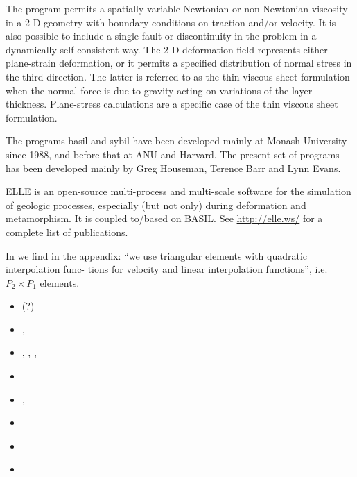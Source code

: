 The program permits a spatially variable Newtonian  or  non-Newtonian  viscosity  in a 2-D 
geometry with boundary conditions on traction and/or velocity.  It is also  possible  
to include  a single fault or discontinuity in the problem in a dynamically self consistent way.  
The 2-D deformation  field represents  either plane-strain deformation, or it permits 
a specified distribution of normal stress in the third  direction.   The  latter is referred 
to as the thin viscous sheet formulation when the normal force is due to  gravity  acting on 
variations of the layer thickness.  Plane-stress calculations are a specific case of 
the thin viscous sheet formulation.

The programs basil and sybil have been developed  mainly  at Monash  University  since  1988,  
and before that at ANU and Harvard.  The present set of  programs  has  been  developed mainly  by  
Greg  Houseman, Terence  Barr  and  Lynn Evans.

ELLE is an open-source multi-process and multi-scale software for the simulation of geologic processes, 
especially (but not only) during deformation and metamorphism. It is coupled to/based on BASIL. 
See \url{http://elle.ws/} for a complete list of publications.

In \textcite{baho96} we find in the appendix: ``we use triangular elements with quadratic interpolation func-
tions for velocity and linear interpolation functions'', i.e. $P_2 \times P_1$ elements.

\begin{small}
\begin{itemize}
\item[\nineteenninetytwo]    \textcite{baho92}(?)
\item[\nineteenninetysix]    \textcite{baho96},  \textcite{hoen96}
\item[\nineteenninetyseven]  \textcite{hogu97},  \textcite{homo97},
                             \textcite{bobt97},  \textcite{neho97}
\item[\twothousand]          \textcite{honk00}
\item[\twothousandone]       \textcite{tesb01},  \textcite{jebe01}
\item[\twothousandeight]     \textcite{bokj08}
\item[\twothousandseventeen] \textcite{waeh17}
\item[\twothousandnineteen]  \textcite{llor19}
\end{itemize}
\end{small}


